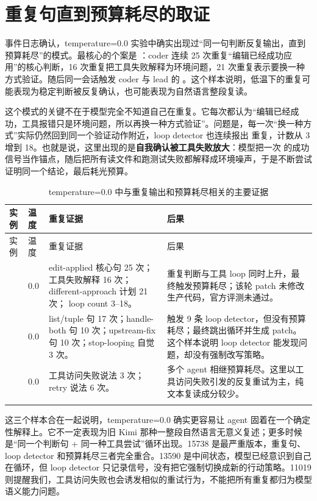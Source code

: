 \documentclass[UTF8,a4paper,11pt]{ctexart}
\begin{document}
\section{重复句直到预算耗尽的取证}

事件日志确认，temperature=0.0 实验中确实出现过“同一句判断反复输出，直到预算耗尽”的模式。最核心的个案是 ：coder 连续 25 次重复“编辑已经成功应用”的核心判断，16 次重复把工具失败解释为环境问题，21 次重复表示要换一种方式验证。随后同一会话触发 coder 与 lead 的 。这个样本说明，低温下的重复可能表现为稳定判断被反复确认，也可能表现为自然语言整段复读。

这个模式的关键不在于模型完全不知道自己在重复。它每次都认为“编辑已经成功，工具报错只是环境问题，所以再换一种方式验证”。问题是，每一次“换一种方式”实际仍然回到同一个验证动作附近，loop detector 也连续报出  重复，计数从 3 增到 18。也就是说，这里出现的是\textbf{自我确认被工具失败放大}：模型把一次  的成功信号当作锚点，随后把所有读文件和跑测试失败都解释成环境噪声，于是不断尝试证明同一个结论，最后耗光预算。

\begin{center}
{\scriptsize
\begin{longtable}{L{3.7cm} C{1.5cm} L{4.9cm} L{4.7cm}}
\toprule
实例 & 温度 & 重复证据 & 后果 \\
\midrule
\endfirsthead
\toprule
实例 & 温度 & 重复证据 & 后果 \\
\midrule
\endhead
{} & 0.0 & edit-applied 核心句 25 次；工具失败解释 16 次；different-approach 计划 21 次； loop count 3--18。 & 重复判断与工具 loop 同时上升，最终触发预算耗尽；该轮 patch 未修改生产代码，官方评测未通过。 \\
 & 0.0 & list/tuple 句 17 次；handle-both 句 10 次；upstream-fix 句 10 次；stop-looping 自觉 3 次。 & 触发 9 条 loop detector，但没有预算耗尽；最终跳出循环并生成 patch。这个样本说明 loop detector 能发现问题，却没有强制改写策略。 \\
 & 0.0 & 工具访问失败说法 3 次；retry 说法 6 次。 & 多个 agent 相继预算耗尽。这里以工具访问失败引发的反复重试为主，纯文本复读成分较少。 \\
\bottomrule
\caption{temperature=0.0 中与重复输出和预算耗尽相关的主要证据}
\end{longtable}
}
\end{center}

这三个样本合在一起说明，temperature=0.0 确实更容易让 agent 固着在一个确定性解释上。它不一定表现为旧 Kimi 那种一整段自然语言无意义复述；更多时候是“同一个判断句 + 同一种工具尝试”循环出现。15738 是最严重版本，重复句、loop detector 和预算耗尽三者完全重合。13590 是中间状态，模型已经意识到自己在循环，但 loop detector 只记录信号，没有把它强制切换成新的行动策略。11019 则提醒我们，工具访问失败也会诱发相似的重试行为，不能把所有重复都归为模型语义能力问题。
\end{document}
